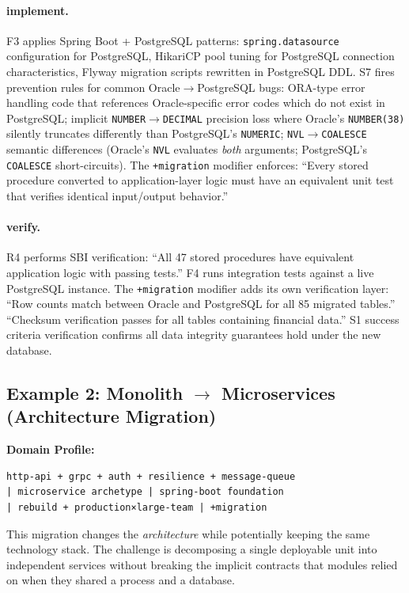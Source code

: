 \documentclass[11pt,a4paper,openright,twoside]{report}
\begin{document}
\paragraph{implement.}
F3 applies Spring Boot + PostgreSQL patterns: \texttt{spring.datasource} configuration for PostgreSQL, HikariCP pool tuning for PostgreSQL connection characteristics, Flyway migration scripts rewritten in PostgreSQL DDL. S7 fires prevention rules for common Oracle$\to$PostgreSQL bugs: ORA-type error handling code that references Oracle-specific error codes which do not exist in PostgreSQL; implicit \texttt{NUMBER}$\to$\texttt{DECIMAL} precision loss where Oracle's \texttt{NUMBER(38)} silently truncates differently than PostgreSQL's \texttt{NUMERIC}; \texttt{NVL}$\to$\texttt{COALESCE} semantic differences (Oracle's \texttt{NVL} evaluates \emph{both} arguments; PostgreSQL's \texttt{COALESCE} short-circuits). The \texttt{+migration} modifier enforces: ``Every stored procedure converted to application-layer logic must have an equivalent unit test that verifies identical input/output behavior.''

\paragraph{verify.}
R4 performs SBI verification: ``All 47 stored procedures have equivalent application logic with passing tests.'' F4 runs integration tests against a live PostgreSQL instance. The \texttt{+migration} modifier adds its own verification layer: ``Row counts match between Oracle and PostgreSQL for all 85 migrated tables.'' ``Checksum verification passes for all tables containing financial data.'' S1 success criteria verification confirms all data integrity guarantees hold under the new database.

\subsection{Example 2: Monolith $\to$ Microservices (Architecture Migration)}

\textbf{Domain Profile:}
\begin{verbatim}
http-api + grpc + auth + resilience + message-queue
| microservice archetype | spring-boot foundation
| rebuild + production×large-team | +migration
\end{verbatim}

This migration changes the \emph{architecture} while potentially keeping the same technology stack. The challenge is decomposing a single deployable unit into independent services without breaking the implicit contracts that modules relied on when they shared a process and a database.
\end{document}
